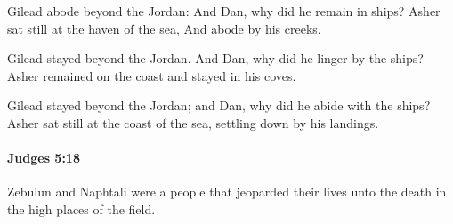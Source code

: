 			\begin{versebox}
					\item[BHS] 
					\item[ASV] Gilead abode beyond the Jordan: And Dan, why did he remain in ships? Asher sat still at the haven of the sea, And abode by his creeks.
					\item[NIV] Gilead stayed beyond the Jordan. And Dan, why did he linger by the ships? Asher remained on the coast and stayed in his coves.
					\item[NRSV] Gilead stayed beyond the Jordan; and Dan, why did he abide with the ships? Asher sat still at the coast of the sea, settling down by his landings.
			\end{versebox}

		\paragraph{Judges 5:18} %
			\label{JUDGES-5-18}

			Zebulun and Naphtali were a people that jeoparded their lives unto the death in the high places of the field.

